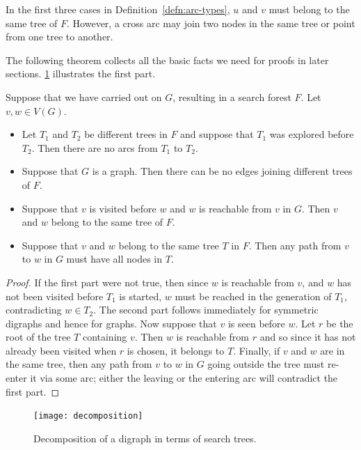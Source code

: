In the first three cases in Definition~\ref{defn:arc-types}, 
$u$ and $v$ must belong to the same tree of $F$. However, a cross arc may 
join two nodes in the same tree or point from one tree to another. 

The following theorem collects all the basic facts we need for proofs
in later sections. \cref{fig:travdecomp} illustrates the first part.

\begin{Theorem}
\label{thm:trav}
Suppose that we have carried out  on $G$, 
resulting in a search forest $F$. Let $v, w \in V(G)$.
\begin{itemize}
\item Let $T_1$ and $T_2$ be different trees in $F$ and suppose that $T_1$ was 
explored before $T_2$. Then there are no arcs from $T_1$ to $T_2$. 

\item Suppose that $G$ is a graph. Then there can be no edges joining different 
trees of $F$.

\item Suppose that $v$ is visited before $w$ and $w$ is reachable from $v$ in 
$G$. Then $v$ and $w$ belong to the same tree of $F$.

\item Suppose that $v$ and $w$ belong to the same tree $T$ in $F$. Then any path
 from $v$ to $w$ in $G$ must have all nodes in $T$.
\end{itemize}
\end{Theorem}

\begin{proof}
If the first part were not true, then since $w$ is reachable from $v$,
and $w$ has not been visited before $T_1$ is started, $w$ must be reached
in the generation of $T_1$, contradicting $w\in T_2$. The second part
follows immediately for symmetric digraphs and hence for graphs. Now
suppose that $v$ is seen before $w$. Let $r$ be the root of the tree $T$
containing $v$. Then $w$ is reachable from $r$ and so since it has not
already been visited when $r$ is chosen, it belongs to $T$. Finally, if
$v$ and $w$ are in the same tree, then any path from $v$ to $w$ in $G$
going outside the tree must re-enter it via some arc; either the leaving
or the entering arc will contradict the first part.
\end{proof}


\begin{figure}[htbp]
  \centering
  \texttt{[image: decomposition]}
  \caption{Decomposition of a digraph in terms of search trees.}
  \label{fig:travdecomp}
\end{figure}

